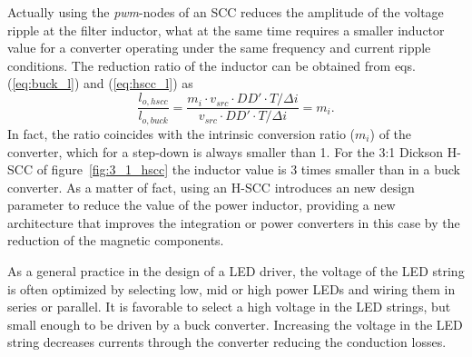 
Actually using the \emph{pwm}-nodes of an SCC reduces the amplitude of the voltage ripple at the filter inductor, what at the same time requires a smaller inductor value for a converter operating under the same frequency and current ripple conditions. The reduction ratio of the inductor can be obtained from eqs. (\ref{eq:buck_l}) and (\ref{eq:hscc_l}) as
\begin{equation}
 \frac{l_{o,hscc}}{l_{o,buck}} =  \frac{{ m_i \cdot v_{src} \cdot DD' \cdot T}/{\Delta i} }{{  v_{src} \cdot DD' \cdot T}/{\Delta i}} = m_i.
\label{eq:l_m}
\end{equation}
In fact, the ratio coincides with the intrinsic conversion ratio ($m_i$) of the converter, which for a step-down is always smaller than 1. For the 3:1 Dickson H-SCC of figure~\ref{fig:3_1_hscc} the inductor value is 3 times smaller than in a buck converter. As a matter of fact, using an H-SCC introduces an new design parameter to reduce the value of the power inductor, providing a new architecture that improves the integration or power converters in this case by the reduction of the magnetic components.


As a general practice in the design of a LED driver, the voltage of
the LED string is often optimized by selecting low, mid or high
power LEDs and wiring them in series or parallel. It is favorable
to select a high voltage in the LED strings, but small enough to be
driven by a buck converter. Increasing the voltage in the LED
string decreases currents through the converter reducing the
conduction losses.


